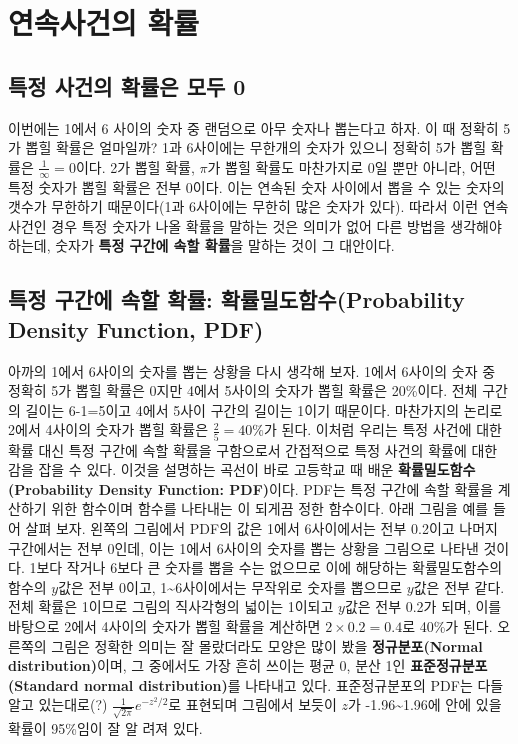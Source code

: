 \documentclass[]{book}
\begin{document}
\section{연속사건의
확률}\label{uxc5f0uxc18duxc0acuxac74uxc758-uxd655uxb960}

\subsection{특정 사건의 확률은 모두
0}\label{uxd2b9uxc815-uxc0acuxac74uxc758-uxd655uxb960uxc740-uxbaa8uxb450-0}

이번에는 1에서 6 사이의 숫자 중 랜덤으로 아무 숫자나 뽑는다고 하자. 이
때 정확히 5가 뽑힐 확률은 얼마일까? 1과 6사이에는 무한개의 숫자가 있으니
정확히 5가 뽑힐 확률은 \(\frac{1}{\infty}=0\)이다. 2가 뽑힐 확률,
\(\pi\)가 뽑힐 확률도 마찬가지로 0일 뿐만 아니라, 어떤 특정 숫자가 뽑힐
확률은 전부 0이다. 이는 연속된 숫자 사이에서 뽑을 수 있는 숫자의 갯수가
무한하기 때문이다(1과 6사이에는 무한히 많은 숫자가 있다). 따라서 이런
연속사건인 경우 특정 숫자가 나올 확률을 말하는 것은 의미가 없어 다른
방법을 생각해야 하는데, 숫자가 \textbf{특정 구간에 속할 확률}을 말하는
것이 그 대안이다.

\subsection{특정 구간에 속할 확률: 확률밀도함수(Probability Density
Function,
PDF)}\label{uxd2b9uxc815-uxad6cuxac04uxc5d0-uxc18duxd560-uxd655uxb960-uxd655uxb960uxbc00uxb3c4uxd568uxc218probability-density-function-pdf}

아까의 1에서 6사이의 숫자를 뽑는 상황을 다시 생각해 보자. 1에서 6사이의
숫자 중 정확히 5가 뽑힐 확률은 0지만 4에서 5사이의 숫자가 뽑힐 확률은
20\%이다. 전체 구간의 길이는 6-1=5이고 4에서 5사이 구간의 길이는 1이기
때문이다. 마찬가지의 논리로 2에서 4사이의 숫자가 뽑힐 확률은
\(\frac{2}{5}=40\%\)가 된다. 이처럼 우리는 특정 사건에 대한 확률 대신
특정 구간에 속할 확률을 구함으로서 간접적으로 특정 사건의 확률에 대한
감을 잡을 수 있다. 이것을 설명하는 곡선이 바로 고등학교 때 배운
\textbf{확률밀도함수(Probability Density Function: PDF)}이다. PDF는 특정
구간에 속할 확률을 계산하기 위한 함수이며 함수를 나타내는 \textbf{}이
되게끔 정한 함수이다. 아래 그림을 예를 들어 살펴 보자. 왼쪽의 그림에서
PDF의 값은 1에서 6사이에서는 전부 0.2이고 나머지 구간에서는 전부 0인데,
이는 1에서 6사이의 숫자를 뽑는 상황을 그림으로 나타낸 것이다. 1보다
작거나 6보다 큰 숫자를 뽑을 수는 없으므로 이에 해당하는 확률밀도함수의
함수의 \(y\)값은 전부 0이고, 1\textasciitilde{}6사이에서는 무작위로
숫자를 뽑으므로 \(y\)값은 전부 같다. 전체 확률은 1이므로 그림의
직사각형의 넓이는 1이되고 \(y\)값은 전부 0.2가 되며, 이를 바탕으로 2에서
4사이의 숫자가 뽑힐 확률을 계산하면 \(2\times 0.2=0.4\)로 40\%가 된다.
오른쪽의 그림은 정확한 의미는 잘 몰랐더라도 모양은 많이 봤을
\textbf{정규분포(Normal distribution)}이며, 그 중에서도 가장 흔히 쓰이는
평균 0, 분산 1인 \textbf{표준정규분포(Standard normal distribution)}를
나타내고 있다. 표준정규분포의 PDF는 다들 알고 있는대로(?)
\(\frac{1}{\sqrt{2\pi}}e^{-z^2/2}\)로 표현되며 그림에서 보듯이 \(z\)가
-1.96\textasciitilde{}1.96에 안에 있을 확률이 95\%임이 잘 알 려져 있다.
\end{document}
